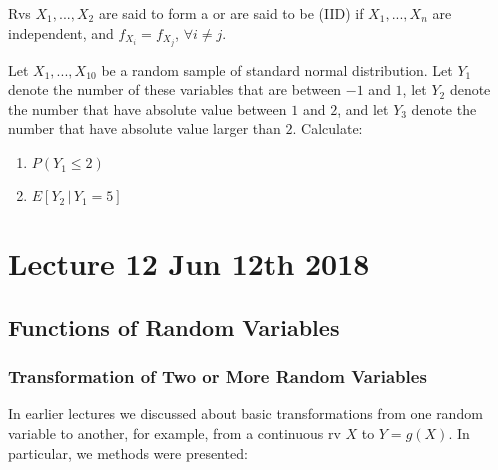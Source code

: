\documentclass[notoc,notitlepage]{tufte-book}
\begin{document}
\begin{defn}
\label{defn:random_sample_iid}
  Rvs $X_1, ..., X_2$ are said to form a  or are said to be  (IID) if $X_1, ..., X_n$ are independent, and $f_{X_i} = f_{X_j}$, $\forall i \neq j$.
\end{defn}

\begin{eg}[Example 3.28]
  Let $X_1, ..., X_{10}$ be a random sample of standard normal distribution. Let $Y_1$ denote the number of these variables that are between $-1$ and $1$, let $Y_2$ denote the number that have absolute value between $1$ and $2$, and let $Y_3$ denote the number that have absolute value larger than $2$. Calculate:
  \begin{enumerate}
    \item $P(Y_1 \leq 2)$
    \item $E[ Y_2 \, | \, Y_1 = 5 ]$
  \end{enumerate}
\end{eg}




\chapter{Lecture 12 Jun 12th 2018}%
\label{chp:lecture_12_jun_12th_2018}

\section{Functions of Random Variables}%
\label{sec:functions_of_random_variables}

\subsection{Transformation of Two or More Random Variables}%
\label{sub:transformation_of_two_or_more_random_variables}

In earlier lectures we discussed about basic transformations from one random variable to another, for example, from a continuous rv $X$ to $Y = g(X)$. In particular, we methods were presented:
\end{document}
